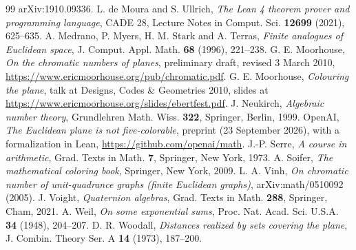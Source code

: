 \documentclass[11pt,a4paper]{amsart}
\theoremstyle{remark}
\begin{document}
\begin{thebibliography}{99}
arXiv:1910.09336.
 L. de Moura and S. Ullrich, \emph{The Lean 4 theorem prover and programming language}, CADE 28,
Lecture Notes in Comput. Sci. \textbf{12699} (2021), 625--635.
\enlargethispage{2\baselineskip}
 A. Medrano, P. Myers, H. M. Stark and A. Terras, \emph{Finite analogues of Euclidean space},
J. Comput. Appl. Math. \textbf{68} (1996), 221--238.
 G. E. Moorhouse, \emph{On the chromatic numbers of planes}, preliminary draft, revised
3 March 2010, \url{https://www.ericmoorhouse.org/pub/chromatic.pdf}.
 G. E. Moorhouse, \emph{Colouring the plane}, talk at Designs, Codes \& Geometries
2010, slides at \url{https://www.ericmoorhouse.org/slides/ebertfest.pdf}.
 J. Neukirch, \emph{Algebraic number theory}, Grundlehren Math. Wiss. \textbf{322}, Springer,
Berlin, 1999.
 OpenAI, \emph{The Euclidean plane is not five-colorable}, preprint (23 September 2026), with a
formalization in Lean, \url{https://github.com/openai/math}.
 J.-P. Serre, \emph{A course in arithmetic}, Grad. Texts in Math. \textbf{7}, Springer, New York, 1973.
 A. Soifer, \emph{The mathematical coloring book}, Springer, New York, 2009.
 L. A. Vinh, \emph{On chromatic number of unit-quadrance graphs (finite Euclidean graphs)},
arXiv:math/0510092 (2005).
 J. Voight, \emph{Quaternion algebras}, Grad. Texts in Math. \textbf{288}, Springer, Cham, 2021.
 A. Weil, \emph{On some exponential sums}, Proc. Nat. Acad. Sci. U.S.A. \textbf{34} (1948),
204--207.
 D. R. Woodall, \emph{Distances realized by sets covering the plane}, J. Combin. Theory Ser. A
\textbf{14} (1973), 187--200.
\end{thebibliography}
\end{document}
